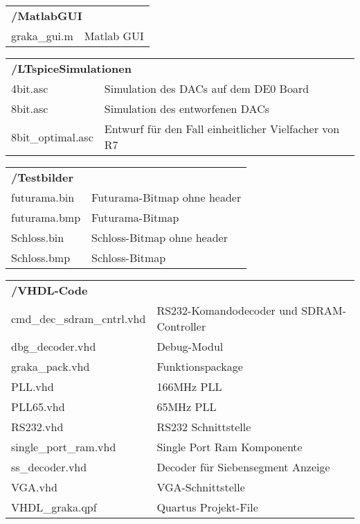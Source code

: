 \begin{table}[h!]
\setlength{\tabcolsep}{1ex}
\def\arraystretch{1.20}
\setlength{\tabcolsep}{1ex}
\small
\begin{tabular}{p{5cm}l}
\multicolumn{2}{l}{\textbf{/MatlabGUI}}\\
graka\_gui.m & Matlab GUI \\ 
\end{tabular} 
\end{table}

\begin{table}[h!]
\setlength{\tabcolsep}{1ex}
\def\arraystretch{1.20}
\setlength{\tabcolsep}{1ex}
\small
\begin{tabular}{p{5cm}l}
\multicolumn{2}{l}{\textbf{/LTspiceSimulationen}}\\
4bit.asc & Simulation des DACs auf dem DE0 Board \\ 
8bit.asc & Simulation des entworfenen DACs \\
8bit\_optimal.asc & Entwurf für den Fall einheitlicher Vielfacher von R7\\
\end{tabular} 
\end{table}

\begin{table}[h!]
\setlength{\tabcolsep}{1ex}
\def\arraystretch{1.20}
\setlength{\tabcolsep}{1ex}
\small
\begin{tabular}{p{5cm}l}
\multicolumn{2}{l}{\textbf{/Testbilder}}\\
futurama.bin & Futurama-Bitmap ohne header \\ 
futurama.bmp & Futurama-Bitmap \\
Schloss.bin & Schloss-Bitmap ohne header\\
Schloss.bmp & Schloss-Bitmap\\
\end{tabular} 
\end{table}

\begin{table}[h!]
\setlength{\tabcolsep}{1ex}
\def\arraystretch{1.20}
\setlength{\tabcolsep}{1ex}
\small
\begin{tabular}{p{5cm}l}
\multicolumn{2}{l}{\textbf{/VHDL-Code}}\\
cmd\_dec\_sdram\_cntrl.vhd & RS232-Komandodecoder und SDRAM-Controller\\
dbg\_decoder.vhd & Debug-Modul \\
graka\_pack.vhd & Funktionspackage \\
PLL.vhd & 166MHz PLL \\
PLL65.vhd & 65MHz PLL \\
RS232.vhd & RS232 Schnittstelle \\
single\_port\_ram.vhd & Single Port Ram Komponente \\
ss\_decoder.vhd & Decoder für Siebensegment Anzeige\\
VGA.vhd & VGA-Schnittstelle \\
VHDL\_graka.qpf & Quartus Projekt-File\\
\end{tabular} 
\end{table}